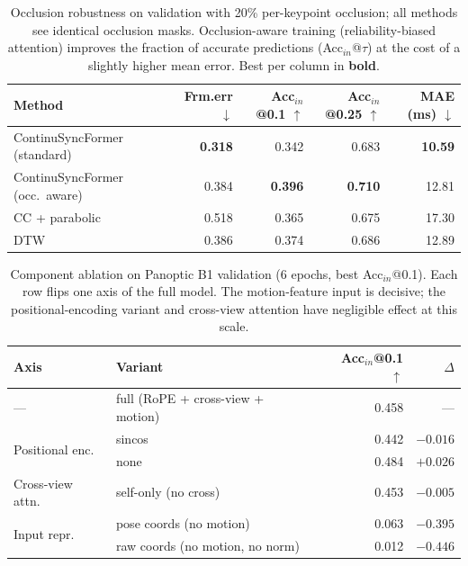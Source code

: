 \begin{table}[t]
\centering
\caption{Occlusion robustness on validation with 20\% per-keypoint occlusion; all
methods see identical occlusion masks. Occlusion-aware training (reliability-biased
attention) improves the fraction of accurate predictions (Acc$_{in}$@$\tau$) at the
cost of a slightly higher mean error. Best per column in \textbf{bold}.}
\label{tab:b1_occlusion}
\begin{tabular}{lrrrr}
\toprule
Method & Frm.err $\downarrow$ & Acc$_{in}$@0.1 $\uparrow$ & Acc$_{in}$@0.25 $\uparrow$ & MAE (ms) $\downarrow$ \\
\midrule
ContinuSyncFormer (standard)     & \textbf{0.318} & 0.342 & 0.683 & \textbf{10.59} \\
ContinuSyncFormer (occ.\ aware)  & 0.384 & \textbf{0.396} & \textbf{0.710} & 12.81 \\
CC + parabolic                   & 0.518 & 0.365 & 0.675 & 17.30 \\
DTW                              & 0.386 & 0.374 & 0.686 & 12.89 \\
\bottomrule
\end{tabular}
\end{table}

\begin{table}[t]
\centering
\caption{Component ablation on Panoptic B1 validation (6 epochs, best
Acc$_{in}$@0.1). Each row flips one axis of the full model. The motion-feature
input is decisive; the positional-encoding variant and cross-view attention have
negligible effect at this scale.}
\label{tab:b1_ablation}
\begin{tabular}{llrr}
\toprule
Axis & Variant & Acc$_{in}$@0.1 $\uparrow$ & $\Delta$ \\
\midrule
--- & full (RoPE + cross-view + motion) & 0.458 & --- \\
\midrule
\multirow{2}{*}{Positional enc.}
 & sincos                & 0.442 & $-0.016$ \\
 & none                  & 0.484 & $+0.026$ \\
\midrule
Cross-view attn.
 & self-only (no cross)  & 0.453 & $-0.005$ \\
\midrule
\multirow{2}{*}{Input repr.}
 & pose coords (no motion)        & 0.063 & $-0.395$ \\
 & raw coords (no motion, no norm) & 0.012 & $-0.446$ \\
\bottomrule
\end{tabular}
\end{table}

